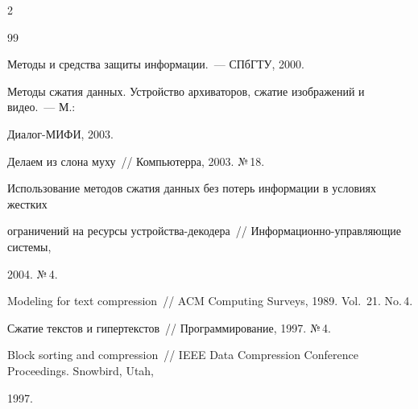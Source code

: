 \begin{multicols}{2}
{{\begin{thebibliography}{99}




Методы и средства защиты информации.~--- СПбГТУ, 2000.









Методы сжатия данных. Устройство архиваторов, сжатие изображений и видео.~--- М.: 


Диалог-МИФИ, 2003.









Делаем из слона муху~// Компьютерра, 2003. №\,18.









Использование методов сжатия данных без потерь информации в условиях жестких 


ограничений на ресурсы устройства-декодера~// Информационно-управляющие системы, 


2004. №\,4.









Modeling for text compression~// ACM Computing Surveys, 1989. Vol.~21. No.\,4.












Сжатие текстов и гипертекстов~// Программирование, 1997. №\,4.









Block sorting and compression~// IEEE Data Compression Conference Proceedings. Snowbird, Utah, 


1997.






\end{thebibliography}}}
\end{multicols}
